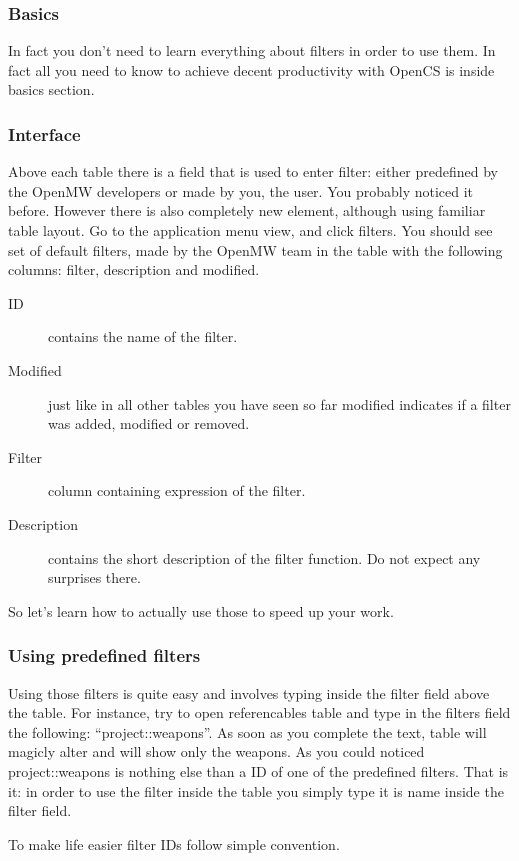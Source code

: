 \subsubsection{Basics}
In fact you don't need to learn everything about filters in order to use them. In fact all you need to know to achieve decent productivity
with OpenCS is inside basics section.

\subsubsection{Interface}
Above each table there is a field that is used to enter filter: either predefined by the OpenMW developers or made by you, the user.
You probably noticed it before. However there is also completely new element, although using familiar table layout. Go to the application
menu view, and click filters. You should see set of default filters, made by the OpenMW team in the table with the following columns: filter,
description and modified.

\begin{description}
 \item[ID] contains the name of the filter.
 \item[Modified] just like in all other tables you have seen so far modified indicates if a filter was added, modified or removed.
 \item[Filter] column containing expression of the filter.
 \item[Description] contains the short description of the filter function. Do not expect any surprises there.
\end{description}

So let's learn how to actually use those to speed up your work.
\subsubsection{Using predefined filters}
Using those filters is quite easy and involves typing inside the filter field above the table. For instance, try to open referencables
table and type in the filters field the following: ``project::weapons''. As soon as you complete the text, table will magicly alter
and will show only the weapons. As you could noticed project::weapons is nothing else than a ID of one of the predefined filters. That is it:
in order to use the filter inside the table you simply type it is name inside the filter field.

To make life easier filter IDs follow simple convention. 

